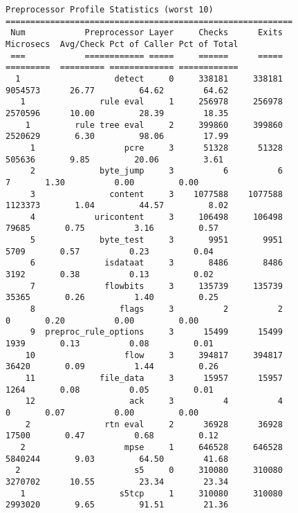 \documentclass[english]{report}
\begin{document}
\begin{figure}
\footnotesize{
\begin{verbatim}
Preprocessor Profile Statistics (worst 10)
==========================================================
 Num            Preprocessor Layer     Checks      Exits           Microsecs  Avg/Check Pct of Caller Pct of Total
 ===            ============ =====     ======      =====           =========  ========= ============= ============
  1                   detect     0     338181     338181             9054573      26.77         64.62        64.62
   1               rule eval     1     256978     256978             2570596      10.00         28.39        18.35
    1         rule tree eval     2     399860     399860             2520629       6.30         98.06        17.99
     1                  pcre     3      51328      51328              505636       9.85         20.06         3.61
     2             byte_jump     3          6          6                   7       1.30          0.00         0.00
     3               content     3    1077588    1077588             1123373       1.04         44.57         8.02
     4            uricontent     3     106498     106498               79685       0.75          3.16         0.57
     5             byte_test     3       9951       9951                5709       0.57          0.23         0.04
     6              isdataat     3       8486       8486                3192       0.38          0.13         0.02
     7              flowbits     3     135739     135739               35365       0.26          1.40         0.25
     8                 flags     3          2          2                   0       0.20          0.00         0.00
     9  preproc_rule_options     3      15499      15499                1939       0.13          0.08         0.01
    10                  flow     3     394817     394817               36420       0.09          1.44         0.26
    11             file_data     3      15957      15957                1264       0.08          0.05         0.01
    12                   ack     3          4          4                   0       0.07          0.00         0.00
    2               rtn eval     2      36928      36928               17500       0.47          0.68         0.12
   2                    mpse     1     646528     646528             5840244       9.03         64.50        41.68
  2                       s5     0     310080     310080             3270702      10.55         23.34        23.34
   1                   s5tcp     1     310080     310080             2993020       9.65         91.51        21.36

\end{verbatim}}
\end{figure}
\end{document}
